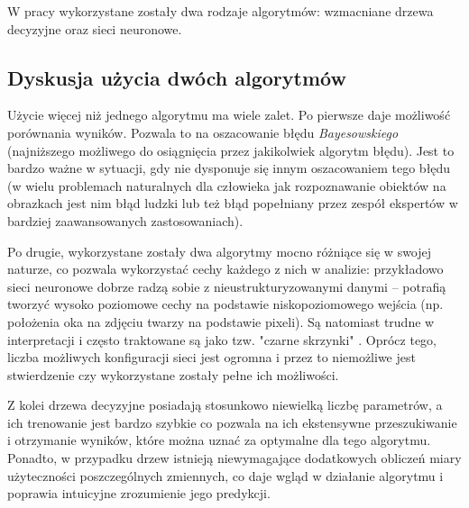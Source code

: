 W pracy wykorzystane zostały dwa rodzaje algorytmów: wzmacniane drzewa decyzyjne oraz sieci neuronowe.
\FloatBarrier



\FloatBarrier
\subsection{Dyskusja użycia dwóch algorytmów}
Użycie więcej niż jednego algorytmu ma wiele zalet. 
Po pierwsze daje możliwość porównania wyników. Pozwala to na oszacowanie błędu \textit{Bayesowskiego} (najniższego możliwego do osiągnięcia przez jakikolwiek algorytm błędu). Jest to bardzo ważne w sytuacji, gdy nie dysponuje się innym oszacowaniem tego błędu (w wielu problemach naturalnych dla człowieka jak rozpoznawanie obiektów na obrazkach jest nim błąd ludzki lub też błąd popełniany przez zespół ekspertów w bardziej zaawansowanych zastosowaniach).

Po drugie, wykorzystane zostały dwa algorytmy mocno różniące się w swojej naturze, co pozwala wykorzystać cechy każdego z nich w analizie: przykładowo sieci neuronowe dobrze radzą sobie z nieustrukturyzowanymi danymi -- potrafią tworzyć wysoko poziomowe cechy na podstawie niskopoziomowego wejścia (np. położenia oka na zdjęciu twarzy na podstawie pixeli). Są natomiast trudne w interpretacji i często traktowane są jako tzw. "czarne skrzynki" . Oprócz tego, liczba możliwych konfiguracji sieci jest ogromna i przez to niemożliwe jest stwierdzenie czy wykorzystane zostały pełne ich możliwości.

Z kolei drzewa decyzyjne posiadają stosunkowo niewielką liczbę parametrów, a ich trenowanie jest bardzo szybkie co pozwala na ich ekstensywne przeszukiwanie i otrzymanie wyników, które można uznać za optymalne dla tego algorytmu.
Ponadto, w przypadku drzew istnieją niewymagające dodatkowych obliczeń miary użyteczności poszczególnych zmiennych, co daje wgląd w działanie algorytmu i poprawia intuicyjne zrozumienie jego predykcji.






